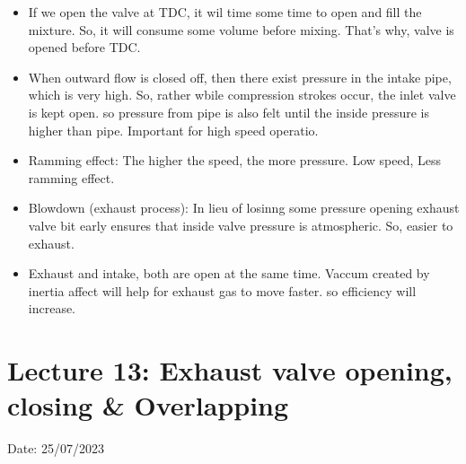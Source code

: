 \documentclass{article}
\begin{document}
\begin{multicols}{2}
\begin{itemize}
    \item If we open the valve at TDC, it wil time some time to open and fill the mixture. So, it will consume some volume before mixing. That's why, valve is opened before TDC. 
    \item When outward flow is closed off, then there exist pressure in the intake pipe, which is very high. So, rather wbile compression strokes occur, the inlet valve is kept open. so pressure from pipe is also felt until the inside pressure is higher than pipe. Important for high speed operatio. 
    \item Ramming effect: The higher the speed, the more pressure. Low speed, Less ramming effect.
    \item Blowdown (exhaust process): In lieu of losinng some pressure opening exhaust valve bit early ensures that inside valve pressure is atmospheric. So, easier to exhaust. 
    \item Exhaust and intake, both are open at the same time. Vaccum created by inertia affect will help for exhaust gas to move faster. so efficiency will increase.

  \end{itemize}
\end{multicols}

\section{Lecture 13: Exhaust valve opening, closing \& Overlapping} 
\hfill Date: 25/07/2023
\end{document}
